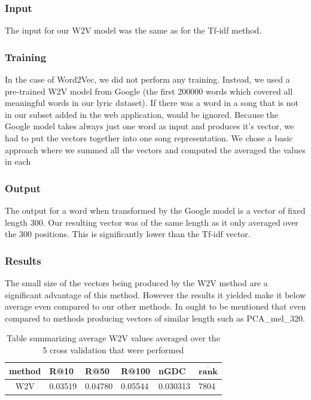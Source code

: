\subsubsection{Input}
The input for our W2V model was the same as for the Tf-idf method.

\subsubsection{Training}
In the case of Word2Vec, we did not perform any training. Instead, we used a pre-trained W2V model from Google  (the first 200000 words which covered all meaningful words in our lyric dataset). If there was a word in a song that is not in our subset added in the web application, would be ignored. Because the Google model takes always just one word as input and produces it's vector, we had to put the vectors together into one song representation. We chose a basic approach where we summed all the vectors and computed the averaged the values in each 

\subsubsection{Output}
The output for a word when transformed by the Google model is a vector of fixed length 300. Our resulting vector was of the same length as it only averaged over the 300 positions. This is significantly lower than the Tf-idf vector.

\subsubsection{Results}
The small size of the vectors being produced by the W2V method are a significant advantage of this method. However the results it yielded make it below average even compared to our other methods. In ought to be mentioned that even compared to methods producing vectors of similar length such as PCA\_mel\_320.

\begin{table}[h]
\centering
\renewcommand{\arraystretch}{1.5}
\begin{tabu} to 1\textwidth { | c || X[c] | X[c] | X[c] | X[c] | X[c] |}
 \hline
 \textbf{method} & \textbf{R@10} & \textbf{R@50} & \textbf{R@100} & \textbf{nGDC} & $ \boldsymbol{\overline{rank}} $ \\
 \hline
 \hline
 W2V & 0.03519 & 0.04780 & 0.05544 & 0.030313 & 7804 \\
 \hline
\end{tabu} \\
\caption{Table summarizing average W2V values averaged over the 5 cross validation that were performed}
\label{table:2}
\end{table}

